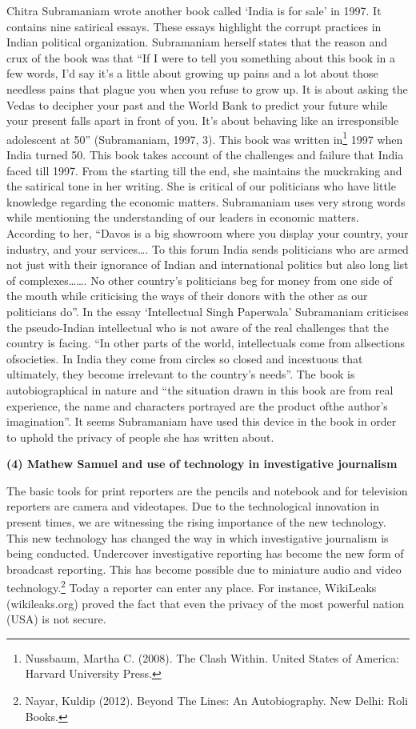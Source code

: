 \begin{multicols}{2}
\noi
Chitra Subramaniam wrote another book called ‘India is for sale’ in 1997. It contains nine
satirical essays. These essays highlight the corrupt practices in Indian political organization.
Subramaniam herself states that the reason and crux of the book was that “If I were to tell you
something about this book in a few words, I’d say it’s a little about growing up pains and a lot
about those needless pains that plague you when you refuse to grow up. It is about asking the
Vedas to decipher your past and the World Bank to predict your future while your present falls
apart in front of you. It’s about behaving like an irresponsible adolescent at 50” (Subramaniam,
1997, 3). This book was written in\footnote{Nussbaum, Martha C. (2008). The Clash Within. United States of America: Harvard University Press.} 1997 when India turned 50. This book takes account of
the challenges and failure that India faced till 1997. From the starting till the end, she maintains
the muckraking and the satirical tone in her writing. She is critical of our politicians who have
little knowledge regarding the economic matters. Subramaniam uses very strong words while mentioning the understanding of our leaders in economic matters. According to her, “Davos is
a big showroom where you display your country, your industry, and your services…. To this
forum India sends politicians who are armed not just with their ignorance of Indian and
international politics but also long list of complexes……. No other country’s politicians beg
for money from one side of the mouth while criticising the ways of their donors with the other
as our politicians do”. In the essay ‘Intellectual Singh Paperwala’ Subramaniam criticises the
pseudo-Indian intellectual who is not aware of the real challenges that the country is facing.
“In other parts of the world, intellectuals come from allsections ofsocieties. In India they come
from circles so closed and incestuous that ultimately, they become irrelevant to the country’s
needs”. The book is autobiographical in nature and “the situation drawn in this book are from
real experience, the name and characters portrayed are the product ofthe author’s imagination”.
It seems Subramaniam have used this device in the book in order to uphold the privacy of
people she has written about.

\noi
{\large \bfseries (4) Mathew Samuel and use of technology in investigative journalism}

\noi
The basic tools for print reporters are the pencils and notebook and for television reporters are
camera and videotapes. Due to the technological innovation in present times, we are witnessing
the rising importance of the new technology. This new technology has changed the way in
which investigative journalism is being conducted. Undercover investigative reporting has
become the new form of broadcast reporting. This has become possible due to miniature audio
and video technology.\footnote{Nayar, Kuldip (2012). Beyond The Lines: An Autobiography. New Delhi: Roli Books.} Today a reporter can enter any place. For instance, WikiLeaks
(wikileaks.org) proved the fact that even the privacy of the most powerful nation (USA) is not
secure.


\end{multicols}
